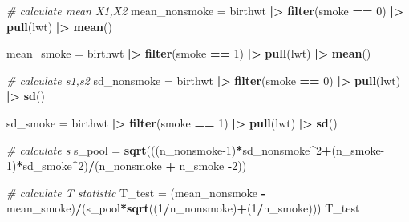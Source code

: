 \documentclass[
]{article}
\newenvironment{Shaded}{\begin{snugshade}}{\end{snugshade}}
\newcommand{\CommentTok}[1]{\textcolor[rgb]{0.56,0.35,0.01}{\textit{#1}}}
\newcommand{\DecValTok}[1]{\textcolor[rgb]{0.00,0.00,0.81}{#1}}
\newcommand{\FunctionTok}[1]{\textcolor[rgb]{0.13,0.29,0.53}{\textbf{#1}}}
\newcommand{\NormalTok}[1]{#1}
\newcommand{\OtherTok}[1]{\textcolor[rgb]{0.56,0.35,0.01}{#1}}
\newcommand{\SpecialCharTok}[1]{\textcolor[rgb]{0.81,0.36,0.00}{\textbf{#1}}}
\begin{document}
\begin{Shaded}
\begin{Highlighting}[]
\CommentTok{\# calculate mean X1,X2}
\NormalTok{mean\_nonsmoke }\OtherTok{=} 
\NormalTok{  birthwt }\SpecialCharTok{|\textgreater{}} 
  \FunctionTok{filter}\NormalTok{(smoke }\SpecialCharTok{==} \DecValTok{0}\NormalTok{) }\SpecialCharTok{|\textgreater{}} 
  \FunctionTok{pull}\NormalTok{(lwt) }\SpecialCharTok{|\textgreater{}}
  \FunctionTok{mean}\NormalTok{()}

\NormalTok{mean\_smoke }\OtherTok{=} 
\NormalTok{  birthwt }\SpecialCharTok{|\textgreater{}} 
  \FunctionTok{filter}\NormalTok{(smoke }\SpecialCharTok{==} \DecValTok{1}\NormalTok{) }\SpecialCharTok{|\textgreater{}} 
  \FunctionTok{pull}\NormalTok{(lwt) }\SpecialCharTok{|\textgreater{}}
  \FunctionTok{mean}\NormalTok{()}

\CommentTok{\# calculate s1,s2}
\NormalTok{sd\_nonsmoke }\OtherTok{=} 
\NormalTok{  birthwt }\SpecialCharTok{|\textgreater{}} 
  \FunctionTok{filter}\NormalTok{(smoke }\SpecialCharTok{==} \DecValTok{0}\NormalTok{) }\SpecialCharTok{|\textgreater{}} 
  \FunctionTok{pull}\NormalTok{(lwt) }\SpecialCharTok{|\textgreater{}}
  \FunctionTok{sd}\NormalTok{()}

\NormalTok{sd\_smoke }\OtherTok{=} 
\NormalTok{  birthwt }\SpecialCharTok{|\textgreater{}} 
  \FunctionTok{filter}\NormalTok{(smoke }\SpecialCharTok{==} \DecValTok{1}\NormalTok{) }\SpecialCharTok{|\textgreater{}} 
  \FunctionTok{pull}\NormalTok{(lwt) }\SpecialCharTok{|\textgreater{}}
  \FunctionTok{sd}\NormalTok{()}

\CommentTok{\# calculate s}
\NormalTok{s\_pool }\OtherTok{=} \FunctionTok{sqrt}\NormalTok{(((n\_nonsmoke}\DecValTok{{-}1}\NormalTok{)}\SpecialCharTok{*}\NormalTok{sd\_nonsmoke}\SpecialCharTok{\^{}}\DecValTok{2}\SpecialCharTok{+}\NormalTok{(n\_smoke}\DecValTok{{-}1}\NormalTok{)}\SpecialCharTok{*}\NormalTok{sd\_smoke}\SpecialCharTok{\^{}}\DecValTok{2}\NormalTok{)}\SpecialCharTok{/}\NormalTok{(n\_nonsmoke }\SpecialCharTok{+}\NormalTok{ n\_smoke }\SpecialCharTok{{-}}\DecValTok{2}\NormalTok{))}

\CommentTok{\# calculate T statistic}
\NormalTok{T\_test }\OtherTok{=}\NormalTok{ (mean\_nonsmoke }\SpecialCharTok{{-}}\NormalTok{ mean\_smoke)}\SpecialCharTok{/}\NormalTok{(s\_pool}\SpecialCharTok{*}\FunctionTok{sqrt}\NormalTok{((}\DecValTok{1}\SpecialCharTok{/}\NormalTok{n\_nonsmoke)}\SpecialCharTok{+}\NormalTok{(}\DecValTok{1}\SpecialCharTok{/}\NormalTok{n\_smoke)))}
\NormalTok{T\_test}
\end{Highlighting}
\end{Shaded}
\end{document}
